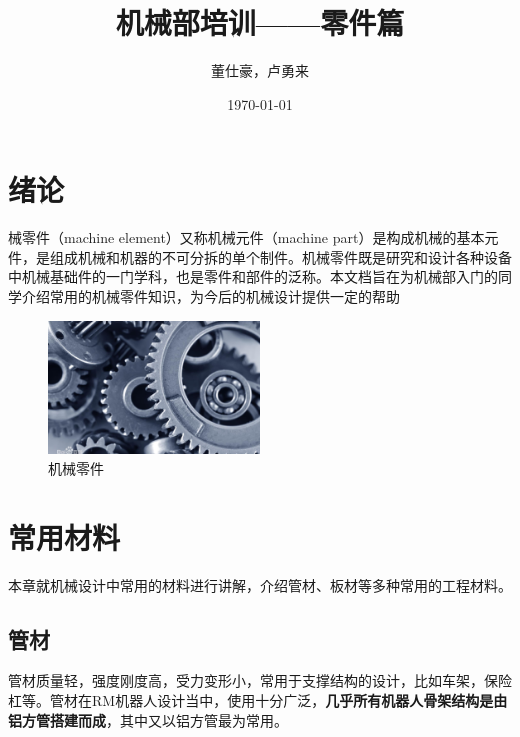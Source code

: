 \documentclass[UTF8]{article} %
\title{机械部培训——零件篇}  %
\author{董仕豪，卢勇来}   %
\date{\today}       %
\begin{document}
\maketitle          %
\newpage
\tableofcontents

\newpage

\section{绪论}
械零件（machine element）又称机械元件（machine part）是构成机械的基本元件，是组成机械和机器的不可分拆的单个制件。机械零件既是研究和设计各种设备中机械基础件的一门学科，也是零件和部件的泛称。本文档旨在为机械部入门的同学介绍常用的机械零件知识，为今后的机械设计提供一定的帮助

\begin{figure}[h]
  \centering
  \includegraphics[width=0.5\textwidth]{kai1.jpg}
  \caption{机械零件}
  \label{fig:kai}
\end{figure}

\section{常用材料}
本章就机械设计中常用的材料进行讲解，介绍管材、板材等多种常用的工程材料。

\subsection{管材}
管材质量轻，强度刚度高，受力变形小，常用于支撑结构的设计，比如车架，保险杠等。管材在RM机器人设计当中，使用十分广泛，\textbf{几乎所有机器人骨架结构是由铝方管搭建而成}，其中又以铝方管最为常用。
\end{document}
